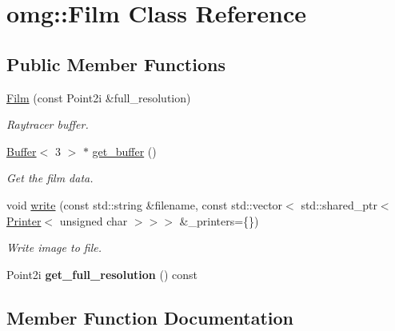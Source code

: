 \hypertarget{classomg_1_1_film}{}\section{omg\+::Film Class Reference}
\label{classomg_1_1_film}
\subsection*{Public Member Functions}
\begin{DoxyCompactItemize}
\item 
\mbox{\label{classomg_1_1_film_af4008051cc838ed6f55dcc98410853b0}} 
\mbox{\hyperlink{classomg_1_1_film_af4008051cc838ed6f55dcc98410853b0}{Film}} (const Point2i \&full\+\_\+resolution)
\begin{DoxyCompactList}\small\item\em Raytracer buffer. \end{DoxyCompactList}\item 
\mbox{\hyperlink{classomg_1_1_buffer}{Buffer}}$<$ 3 $>$ $\ast$ \mbox{\hyperlink{classomg_1_1_film_a41d69c25f1d84409b9cd435ad9856562}{get\+\_\+buffer}} ()
\begin{DoxyCompactList}\small\item\em Get the film data. \end{DoxyCompactList}\item 
\mbox{\label{classomg_1_1_film_a1dccb692bc78a3b5101689111b99fff2}} 
void \mbox{\hyperlink{classomg_1_1_film_a1dccb692bc78a3b5101689111b99fff2}{write}} (const std\+::string \&filename, const std\+::vector$<$ std\+::shared\+\_\+ptr$<$ \mbox{\hyperlink{class_printer}{Printer}}$<$ unsigned char $>$$>$$>$ \&\+\_\+printers=\{\})
\begin{DoxyCompactList}\small\item\em Write image to file. \end{DoxyCompactList}\item 
\mbox{\label{classomg_1_1_film_a44bed57059d62bbd9752e573d61ee05c}} 
Point2i {\bfseries get\+\_\+full\+\_\+resolution} () const
\end{DoxyCompactItemize}


\subsection{Member Function Documentation}
\mbox{\label{classomg_1_1_film_a41d69c25f1d84409b9cd435ad9856562}} 
